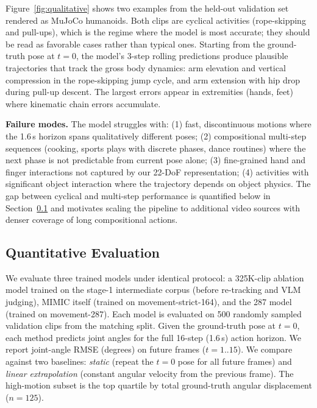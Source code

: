 \documentclass[letterpaper, 10pt, conference]{ieeeconf}
\begin{document}
Figure~\ref{fig:qualitative} shows two examples from the held-out validation set rendered as MuJoCo humanoids. Both clips are cyclical activities (rope-skipping and pull-ups), which is the regime where the model is most accurate; they should be read as favorable cases rather than typical ones. Starting from the ground-truth pose at $t{=}0$, the model's 3-step rolling predictions produce plausible trajectories that track the gross body dynamics: arm elevation and vertical compression in the rope-skipping jump cycle, and arm extension with hip drop during pull-up descent. The largest errors appear in extremities (hands, feet) where kinematic chain errors accumulate.

\textbf{Failure modes.} The model struggles with: (1) fast, discontinuous motions where the 1.6\,s horizon spans qualitatively different poses; (2) compositional multi-step sequences (cooking, sports plays with discrete phases, dance routines) where the next phase is not predictable from current pose alone; (3) fine-grained hand and finger interactions not captured by our 22-DoF representation; (4) activities with significant object interaction where the trajectory depends on object physics. The gap between cyclical and multi-step performance is quantified below in Section~\ref{sec:quantitative} and motivates scaling the pipeline to additional video sources with denser coverage of long compositional actions.

\subsection{Quantitative Evaluation}
\label{sec:quantitative}

We evaluate three trained models under identical protocol: a 325K-clip ablation model trained on the stage-1 intermediate corpus (before re-tracking and VLM judging), MIMIC itself (trained on movement-strict-164), and the 287 model (trained on movement-287). Each model is evaluated on 500 randomly sampled validation clips from the matching split. Given the ground-truth pose at $t{=}0$, each method predicts joint angles for the full 16-step (1.6\,s) action horizon. We report joint-angle RMSE (degrees) on future frames ($t{=}1..15$). We compare against two baselines: \emph{static} (repeat the $t{=}0$ pose for all future frames) and \emph{linear extrapolation} (constant angular velocity from the previous frame). The high-motion subset is the top quartile by total ground-truth angular displacement ($n{=}125$).
\end{document}
